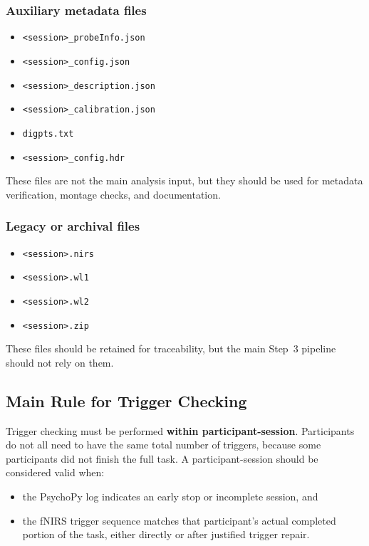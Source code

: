\documentclass[11pt]{article}
\begin{document}
\subsubsection*{Auxiliary metadata files}
\begin{itemize}
    \item \texttt{<session>\_probeInfo.json}
    \item \texttt{<session>\_config.json}
    \item \texttt{<session>\_description.json}
    \item \texttt{<session>\_calibration.json}
    \item \texttt{digpts.txt}
    \item \texttt{<session>\_config.hdr}
\end{itemize}

These files are not the main analysis input, but they should be used for metadata verification,
montage checks, and documentation.

\subsubsection*{Legacy or archival files}
\begin{itemize}
    \item \texttt{<session>.nirs}
    \item \texttt{<session>.wl1}
    \item \texttt{<session>.wl2}
    \item \texttt{<session>.zip}
\end{itemize}

These files should be retained for traceability, but the main Step~3 pipeline should not rely on them.

\subsection{Main Rule for Trigger Checking}
Trigger checking must be performed \textbf{within participant-session}.
Participants do not all need to have the same total number of triggers, because some participants
did not finish the full task.
A participant-session should be considered valid when:
\begin{itemize}
    \item the PsychoPy log indicates an early stop or incomplete session, and
    \item the fNIRS trigger sequence matches that participant's actual completed portion of the task,
    either directly or after justified trigger repair.
\end{itemize}
\end{document}
